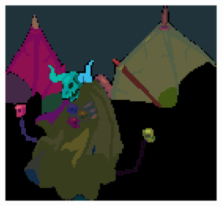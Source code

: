 \begin{figure}[h!]
\begin{minipage}[b]{0.25\textwidth}
    \end{minipage}
    \hfill 
    \begin{minipage}[b]{0.25\textwidth}
        \includegraphics[width=\textwidth]{imagens/demon-idle.result.png}
    \end{minipage}
\end{figure}


